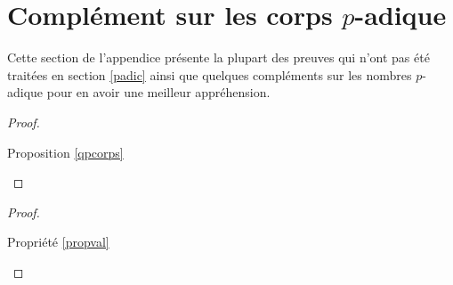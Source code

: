 \section{Complément sur les corps \texorpdfstring{$p$}{p}-adique}
\label{cpadic}

Cette section de l'appendice présente la plupart des preuves qui n'ont pas été traitées en section \ref{padic} ainsi que quelques compléments sur les nombres $p$-adique pour en avoir une meilleur appréhension.

\begin{proof} \hypertarget{qpcorpspreuve}{Proposition \ref{qpcorps}} 
\end{proof}

\begin{proof} \hypertarget{propvalpreuve}{Propriété \ref{propval} }  
	
\end{proof}

